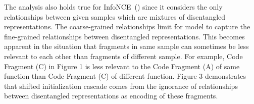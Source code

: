 The analysis also holds true for InfoNCE~(\cite{DenYO18}) since it considers the only relationships between given samples
which are mixtures of disentangled representations.
The coarse-grained relationships limit for model to capture the fine-grained relationships between disentangled representations.
This becomes apparent in the situation that fragments in same sample can sometimes be less relevant to each other than fragments of different sample.
For example, Code Fragment (C) in Figure 1 is less relevant to the Code Fragment (A) of same function than Code Fragment (C) of different function.  
Figure 3 demonstrates that shifted initialization cascade comes from the ignorance of relationships between disentangled representations 
as encoding of these fragments. 

